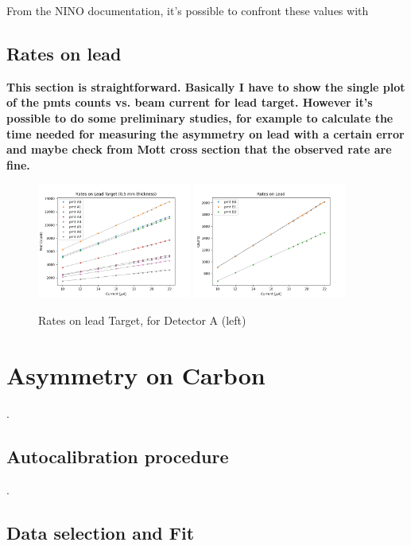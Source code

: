  
From the NINO documentation, it's possible to confront these values with 

\newpage

\subsection{Rates on lead}

{\bfseries This section is straightforward. Basically I have to show the single plot of the pmts counts vs. beam current for lead target. However it's possible to do some preliminary studies, for example to calculate the time needed for measuring the asymmetry on lead with a certain error and maybe check from Mott cross section that the observed rate are fine.}

\begin{figure}[hbtp]
\centering
\includegraphics[width = 0.45\textwidth]{Analysis/Rates_on_lead.png}
\includegraphics[width = 0.45\textwidth]{Analysis/Rates_on_leadB.png}
\caption{Rates on lead Target, for Detector A (left)}
\end{figure}

\section{Asymmetry on Carbon}
.
\subsection{Autocalibration procedure}
.
\subsection{Data selection and Fit}

